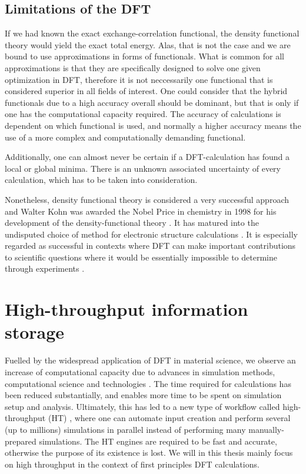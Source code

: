 \subsection{Limitations of the DFT}

If we had known the exact exchange-correlation functional, the density functional theory would yield the exact total energy. Alas, that is not the case and we are bound to use approximations in forms of functionals. What is common for all approximations is that they are specifically designed to solve one given optimization in DFT, therefore it is not neccessarily one functional that is considered superior in all fields of interest. One could consider that the hybrid functionals due to a high accuracy overall should be dominant, but that is only if one has the computational capacity required. The accuracy of calculations is dependent on which functional is used, and normally a higher accuracy means the use of a more complex and computationally demanding functional.

Additionally, one can almost never be certain if a DFT-calculation has found a local or global minima. There is an unknown associated uncertainty of every calculation, which has to be taken into consideration.

Nonetheless, density functional theory is considered a very successful approach and Walter Kohn was awarded the Nobel Price in chemistry in 1998 for his development of the density-functional theory \cite{Freitas1999}. It has matured into the undisputed choice of method for electronic structure calculations \cite{Schleder2019}. It is especially regarded as successful in contexts where DFT can make important contributions to scientific questions where it would be essentially impossible to determine through experiments \cite{DavidSholl2009}. %

\section{High-throughput information storage}


Fuelled by the widespread application of DFT in material science, we observe an increase of computational capacity due to advances in simulation methods, computational science and technologies \cite{Schleder2019}. The time required for calculations has been reduced substantially, and enables more time to be spent on simulation setup and analysis. Ultimately, this has led to a new type of workflow called high-throughput (HT) \cite{Yang2017}, where one can automate input creation and perform several (up to millions) simulations in parallel instead of performing many manually-prepared simulations. The HT engines are required to be fast and accurate, otherwise the purpose of its existence is lost. We will in this thesis mainly focus on high throughput in the context of first principles DFT calculations.

